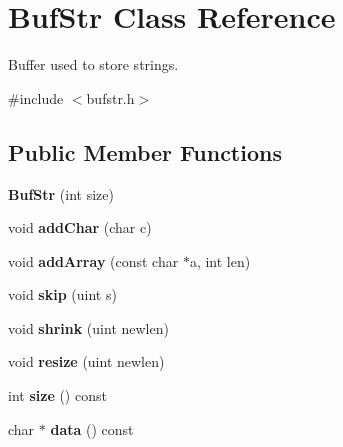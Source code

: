 \hypertarget{class_buf_str}{}\section{Buf\+Str Class Reference}
\label{class_buf_str}


Buffer used to store strings.  




{\ttfamily \#include $<$bufstr.\+h$>$}

\subsection*{Public Member Functions}
\begin{DoxyCompactItemize}
\item 
\mbox{\label{class_buf_str_ad752ce74eb8d9ca7d546836f09ba448b}} 
{\bfseries Buf\+Str} (int size)
\item 
\mbox{\label{class_buf_str_a36ec062edea86b33b794eeab37f32b1c}} 
void {\bfseries add\+Char} (char c)
\item 
\mbox{\label{class_buf_str_a81957fec77e64ad1a7c75e2994d903ec}} 
void {\bfseries add\+Array} (const char $\ast$a, int len)
\item 
\mbox{\label{class_buf_str_a9cc2457c5bf9f46db797dbf5c86f7be2}} 
void {\bfseries skip} (uint s)
\item 
\mbox{\label{class_buf_str_a11fc0e89dd066db9395751269c6a761f}} 
void {\bfseries shrink} (uint newlen)
\item 
\mbox{\label{class_buf_str_af87ab9881190162554a0ace539be4b75}} 
void {\bfseries resize} (uint newlen)
\item 
\mbox{\label{class_buf_str_acfa0b96f6973b4f2f9a73173ae2494c5}} 
int {\bfseries size} () const
\item 
\mbox{\label{class_buf_str_a2b840e5cf1ce94a93f66e2f4ac803949}} 
char $\ast$ {\bfseries data} () const
\item 
\mbox{\label{class_buf_str_a2b15eb265305b14503a2acb86e065b69}} 

\end{DoxyCompactItemize}
